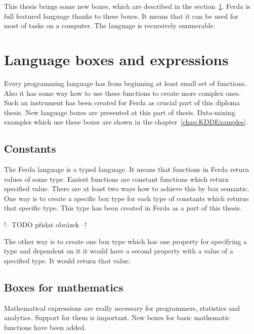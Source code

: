 \documentclass[a4paper,12pt]{book}
\begin{document}
This thesis brings some new boxes, which are described in the section~\ref{sectionNewBoxes}. Ferda is full featured language thanks to these boxes. It means that it can be used for most of tasks on a computer. The language is recursively enumerable.

\section{Language boxes and expressions}
\label{sectionNewBoxes}
Every programming language has from beginning at least small set of functions. Also it has some way how to use these functions to create more complex ones. Such an instrument has been created for Ferda as crucial part of this diploma thesis. New language boxes are presented at this part of thesis. Data-mining examples which use these boxes are shown in the chapter~\ref{chap:KDDExamples}.

\subsection{Constants}
The Ferda language is a typed language. It means that functions in Ferda return values of some type. Easiest functions are constant functions which return specified value. There are at least two ways how to achieve this by box semantic. One way is to create a specific box type for each type of constants which returns that specific type. This type has been created in Ferda as a part of this thesis.

!-- TODO přidat obrázek --!

The other way is to create one box type which has one property for specifying a type and dependent on it it would have a second property with a value of a specified type. It would return that value.

\subsection{Boxes for mathematics}
Mathematical expressions are really necessary for programmers, statistics and analytics. Support for them is important. New boxes for basic mathematic functions have been added.
\end{document}
